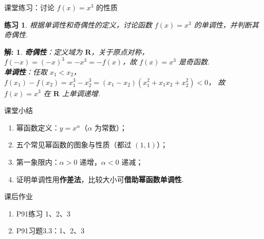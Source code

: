 \documentclass[aspectratio=169,13pt,t] {beamer}
\newtheorem{question}{练习}
\newtheorem*{solve}{解:}
\theoremstyle{definition}
\begin{document}
\begin{frame}{课堂练习：讨论 $f(x)=x^{3}$ 的性质}
	\begin{question}
		根据单调性和奇偶性的定义，讨论函数 $f(x)=x^{3}$ 的单调性，并判断其奇偶性.
	\end{question}
	\pause
	\begin{solve}
		\textbf{奇偶性}：定义域为 $\mathbf{R}$，关于原点对称，
		$f(-x)=(-x)^{3}=-x^{3}=-f(x)$，故 $f(x)=x^{3}$ 是奇函数.\\[2pt]
		\textbf{单调性}：任取 $x_{1}<x_{2}$，
		$f(x_{1})-f(x_{2})=x_{1}^{3}-x_{2}^{3}=(x_{1}-x_{2})(x_{1}^{2}+x_{1}x_{2}+x_{2}^{2})<0$，
		故 $f(x)=x^{3}$ 在 $\mathbf{R}$ 上单调递增.
	\end{solve}
\end{frame}

\begin{frame}{课堂小结}
	\begin{summarybox}[本节要点]
	\begin{enumerate}
		\item 幂函数定义：$y=x^{\alpha}$（$\alpha$ 为常数）；
		\item 五个常见幂函数的图象与性质（都过 $(1,1)$）；
		\item 第一象限内：$\alpha>0$ 递增，$\alpha<0$ 递减；
		\item 证明单调性用\textbf{作差法}，比较大小可\textbf{借助幂函数单调性}.
	\end{enumerate}
	\end{summarybox}
\end{frame}

\begin{frame}{课后作业}
	\begin{summarybox}[作业：]
	\begin{enumerate}
		\item P91练习 1、2、3
		\item P91习题3.3：1、2、3
	\end{enumerate}
	\end{summarybox}
\end{frame}
\end{document}
